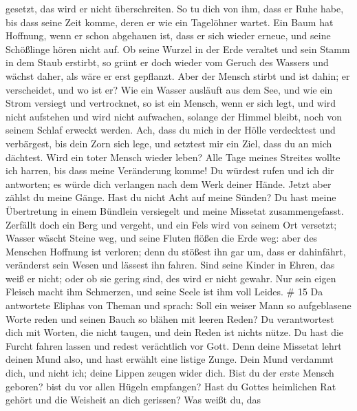 gesetzt, das wird er nicht überschreiten.  So tu dich von
ihm, dass er Ruhe habe, bis dass seine Zeit komme, deren er wie ein
Tagelöhner wartet.  Ein Baum hat Hoffnung, wenn er schon
abgehauen ist, dass er sich wieder erneue, und seine Schößlinge hören
nicht auf.  Ob seine Wurzel in der Erde veraltet und sein
Stamm in dem Staub erstirbt,  so grünt er doch wieder vom
Geruch des Wassers und wächst daher, als wäre er erst gepflanzt.
 Aber der Mensch stirbt und ist dahin; er verscheidet, und
wo ist er?  Wie ein Wasser ausläuft aus dem See, und wie
ein Strom versiegt und vertrocknet,  so ist ein Mensch,
wenn er sich legt, und wird nicht aufstehen und wird nicht aufwachen,
solange der Himmel bleibt, noch von seinem Schlaf erweckt werden.
 Ach, dass du mich in der Hölle verdecktest und verbärgest,
bis dein Zorn sich lege, und setztest mir ein Ziel, dass du an mich
dächtest.  Wird ein toter Mensch wieder leben? Alle Tage
meines Streites wollte ich harren, bis dass meine Veränderung komme!
 Du würdest rufen und ich dir antworten; es würde dich
verlangen nach dem Werk deiner Hände.  Jetzt aber zählst du
meine Gänge. Hast du nicht Acht auf meine Sünden?  Du hast
meine Übertretung in einem Bündlein versiegelt und meine Missetat
zusammengefasst.  Zerfällt doch ein Berg und vergeht, und
ein Fels wird von seinem Ort versetzt;  Wasser wäscht
Steine weg, und seine Fluten flößen die Erde weg: aber des Menschen
Hoffnung ist verloren;  denn du stößest ihn gar um, dass er
dahinfährt, veränderst sein Wesen und lässest ihn fahren. 
Sind seine Kinder in Ehren, das weiß er nicht; oder ob sie gering sind,
des wird er nicht gewahr.  Nur sein eigen Fleisch macht ihm
Schmerzen, und seine Seele ist ihm voll Leides. \# 15  Da
antwortete Eliphas von Theman und sprach:  Soll ein weiser
Mann so aufgeblasene Worte reden und seinen Bauch so blähen mit leeren
Reden?  Du verantwortest dich mit Worten, die nicht taugen,
und dein Reden ist nichts nütze.  Du hast die Furcht fahren
lassen und redest verächtlich vor Gott.  Denn deine Missetat
lehrt deinen Mund also, und hast erwählt eine listige Zunge.
 Dein Mund verdammt dich, und nicht ich; deine Lippen zeugen
wider dich.  Bist du der erste Mensch geboren? bist du vor
allen Hügeln empfangen?  Hast du Gottes heimlichen Rat
gehört und die Weisheit an dich gerissen?  Was weißt du, das
